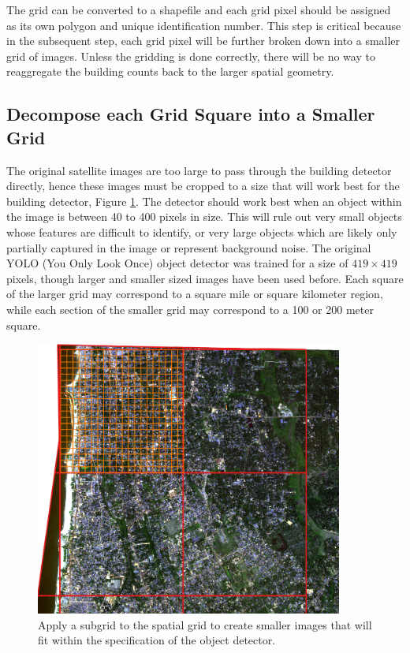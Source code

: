 \documentclass[12pt, a4paper, oneside, headinclude, footinclude]{article}
\begin{document}
The grid can be converted to a shapefile and each grid pixel should be assigned as its own polygon and unique identification number. This step is critical because in the subsequent step, each grid pixel will be further broken down into a smaller grid of images. Unless the gridding is done correctly, there will be no way to reaggregate the building counts back to the larger spatial geometry. 

\subsection{Decompose each Grid Square into a Smaller Grid}

The original satellite images are too large to pass through the building
detector directly, hence these images must be cropped to a size that will
work best for the building detector, Figure \ref{fig:smallgrid}. The detector should work best when an
object within the image is between 40 to 400 pixels in size. This will rule out
very small objects whose features are difficult to identify, or very large
objects which are likely only partially captured in the image or represent
background noise. The original YOLO (You Only Look Once) object detector was trained for a size of
$419 \times 419$ pixels, though larger and smaller sized images have been used
before. Each square of the larger grid may correspond to a square mile or
square kilometer region, while each section of the smaller grid may correspond to a 100 or 200 meter square. 

\begin{figure}
	\centering
    \includegraphics[width=0.9\textwidth]{images/negambo_subgrid_for_image_creation_transparent.png}
    \caption[Creating a spatial subgrid] {Apply a subgrid to the spatial grid to
    create smaller images that will fit within the specification of the object detector.}
    \label{fig:smallgrid}
  \end{figure}
  
\end{document}
